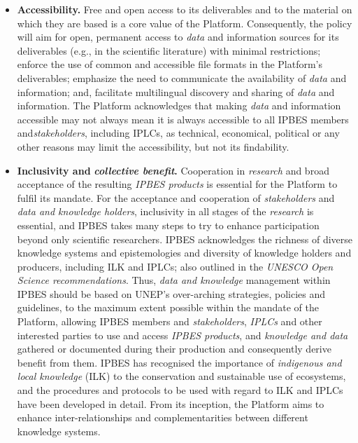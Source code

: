 \documentclass{article}
\begin{document}
\begin{itemize}
    \item \textbf{Accessibility.} Free and open access to its deliverables and to the material on which they are based is a core value of the Platform. Consequently, the policy will aim for open, permanent access to \textit{data} and information sources for its deliverables (e.g., in the scientific literature) with minimal restrictions; enforce the use of common and accessible file formats in the Platform’s deliverables; emphasize the need to communicate the availability of \textit{data} and information; and, facilitate multilingual discovery and sharing of \textit{data} and information. The Platform acknowledges that making \textit{data} and information accessible may not always mean it is always accessible to all IPBES members and\textit{stakeholders}, including IPLCs, as technical, economical, political or any other reasons may limit the accessibility, but not its findability.
    \item \textbf{Inclusivity and }\textit{\textbf{collective benefit}}\textbf{.} Cooperation in \textit{research} and broad acceptance of the resulting \textit{IPBES products} is essential for the Platform to fulfil its mandate. For the acceptance and cooperation of \textit{stakeholders} and \textit{data and knowledge holders}, inclusivity in all stages of the \textit{research} is essential, and IPBES takes many steps to try to enhance participation beyond only scientific researchers. IPBES acknowledges the richness of diverse knowledge systems and epistemologies and diversity of knowledge holders and producers, including ILK and IPLCs; also outlined in the \textit{UNESCO Open Science recommendations}. Thus, \textit{data and knowledge }management within IPBES should be based on UNEP’s over-arching strategies, policies and guidelines, to the maximum extent possible within the mandate of the Platform, allowing IPBES members and \textit{stakeholders}, \textit{IPLCs} and other interested parties to use and access \textit{IPBES products}, and \textit{knowledge and data} gathered or documented during their production and consequently derive benefit from them. IPBES has recognised the importance of \textit{indigenous and local knowledge }(ILK) to the conservation and sustainable use of ecosystems, and the procedures and protocols to be used with regard to ILK and IPLCs have been developed in detail. From its inception, the Platform aims to enhance inter-relationships and complementarities between different knowledge systems.
\end{itemize}
\end{document}
